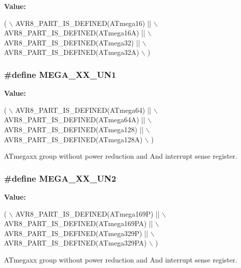 {\bfseries Value\-:}
\begin{DoxyCode}
( \(\backslash\)
                AVR8\_PART\_IS\_DEFINED(ATmega16)    || \(\backslash\)
                AVR8\_PART\_IS\_DEFINED(ATmega16A)   || \(\backslash\)
                AVR8\_PART\_IS\_DEFINED(ATmega32)    || \(\backslash\)
                AVR8\_PART\_IS\_DEFINED(ATmega32A) \(\backslash\)
                )
\end{DoxyCode}
\hypertarget{group__mega__part__macros__group_gaad35e34280ef078dec0cc18c3ea6d3f6}{
\subsubsection[{M\-E\-G\-A\-\_\-\-X\-X\-\_\-\-U\-N1}]{\setlength{\rightskip}{0pt plus 5cm}\#define M\-E\-G\-A\-\_\-\-X\-X\-\_\-\-U\-N1}}\label{group__mega__part__macros__group_gaad35e34280ef078dec0cc18c3ea6d3f6}
{\bfseries Value\-:}
\begin{DoxyCode}
( \(\backslash\)
                AVR8\_PART\_IS\_DEFINED(ATmega64)    || \(\backslash\)
                AVR8\_PART\_IS\_DEFINED(ATmega64A)   || \(\backslash\)
                AVR8\_PART\_IS\_DEFINED(ATmega128)   || \(\backslash\)
                AVR8\_PART\_IS\_DEFINED(ATmega128A) \(\backslash\)
                )
\end{DoxyCode}
A\-Tmegaxx group without power reduction and And interrupt sense register. \hypertarget{group__mega__part__macros__group_ga5f4566d4ddaa3cee92d4c78162594f2d}{
\subsubsection[{M\-E\-G\-A\-\_\-\-X\-X\-\_\-\-U\-N2}]{\setlength{\rightskip}{0pt plus 5cm}\#define M\-E\-G\-A\-\_\-\-X\-X\-\_\-\-U\-N2}}\label{group__mega__part__macros__group_ga5f4566d4ddaa3cee92d4c78162594f2d}
{\bfseries Value\-:}
\begin{DoxyCode}
( \(\backslash\)
                AVR8\_PART\_IS\_DEFINED(ATmega169P)  || \(\backslash\)
                AVR8\_PART\_IS\_DEFINED(ATmega169PA) || \(\backslash\)
                AVR8\_PART\_IS\_DEFINED(ATmega329P)  || \(\backslash\)
                AVR8\_PART\_IS\_DEFINED(ATmega329PA) \(\backslash\)
                )
\end{DoxyCode}
A\-Tmegaxx group without power reduction and And interrupt sense register. 